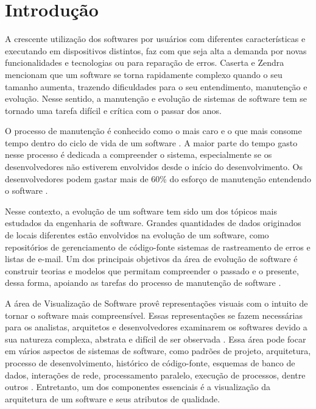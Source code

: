 \chapter{Introdução} \label{ch:introducao}

A crescente utilização dos softwares por usuários com diferentes características e executando em dispositivos distintos, faz com que seja alta a demanda por novas funcionalidades e tecnologias ou para reparação de erros. Caserta e Zendra \cite{Caserta2011} mencionam que um software se torna rapidamente complexo quando o seu tamanho aumenta, trazendo dificuldades para o seu entendimento, manutenção e evolução. Nesse sentido, a manutenção e evolução de sistemas de software tem se tornado uma tarefa difícil e crítica com o passar dos anos.

O processo de manutenção é conhecido como o mais caro e o que mais consome tempo dentro do ciclo de vida de um software \cite{Abreu1995}. A maior parte do tempo gasto nesse processo é dedicada a compreender o sistema, especialmente se os desenvolvedores não estiverem envolvidos desde o início do desenvolvimento. Os desenvolvedores podem gastar mais de 60\% do esforço de manutenção entendendo o software \cite{Corbi1989}.

Nesse contexto, a evolução de um software tem sido um dos tópicos mais estudados da engenharia de software. Grandes quantidades de dados originados de locais diferentes estão envolvidos na evolução de um software, como repositórios de gerenciamento de código-fonte  sistemas de rastreamento de erros e listas de e-mail. Um dos principais objetivos da área de evolução de software é construir teorias e modelos que permitam compreender o passado e o presente, dessa forma, apoiando as tarefas do processo de manutenção de software \cite{Novais2013}.

A área de Visualização de Software provê representações visuais com o intuito de tornar o software mais compreensível. Essas representações se fazem necessárias para os analistas, arquitetos e desenvolvedores examinarem os softwares devido a sua natureza complexa, abstrata e difícil de ser observada \cite{Petre2006}. Essa área pode focar em vários aspectos de sistemas de software, como padrões de projeto, arquitetura, processo de desenvolvimento, histórico de código-fonte, esquemas de banco de dados, interações de rede, processamento paralelo, execução de processos, dentre outros \cite{Ghanam2008}. Entretanto, um dos componentes essenciais é a visualização da arquitetura de um software e seus atributos de qualidade.

